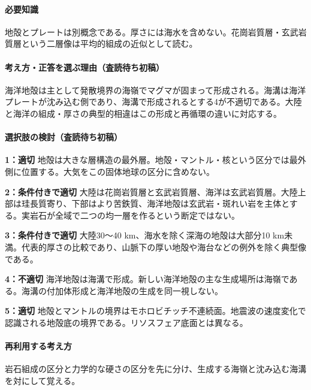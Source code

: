 \paragraph{必要知識} 地殻とプレートは別概念である。厚さには海水を含めない。花崗岩質層・玄武岩質層という二層像は平均的組成の近似として読む。

\paragraph{考え方・正答を選ぶ理由（査読待ち初稿）} 海洋地殻は主として発散境界の海嶺でマグマが固まって形成される。海溝は海洋プレートが沈み込む側であり、海溝で形成されるとする4が不適切である。大陸と海洋の組成・厚さの典型的相違はこの形成と再循環の違いに対応する。

\paragraph{選択肢の検討（査読待ち初稿）}\mbox{}\par

\noindent\textbf{1：適切} 地殻は大きな層構造の最外層。地殻・マントル・核という区分では最外側に位置する。大気をこの固体地球の区分に含めない。\par

\noindent\textbf{2：条件付きで適切} 大陸は花崗岩質層と玄武岩質層、海洋は玄武岩質層。大陸上部は珪長質寄り、下部はより苦鉄質、海洋地殻は玄武岩・斑れい岩を主体とする。実岩石が全域で二つの均一層を作るという断定ではない。\par

\noindent\textbf{3：条件付きで適切} 大陸30〜40 km、海水を除く深海の地殻は大部分10 km未満。代表的厚さの比較であり、山脈下の厚い地殻や海台などの例外を除く典型像である。\par

\noindent\textbf{4：不適切} 海洋地殻は海溝で形成。新しい海洋地殻の主な生成場所は海嶺である。海溝の付加体形成と海洋地殻の生成を同一視しない。\par

\noindent\textbf{5：適切} 地殻とマントルの境界はモホロビチッチ不連続面。地震波の速度変化で認識される地殻底の境界である。リソスフェア底面とは異なる。\par

\paragraph{再利用する考え方} 岩石組成の区分と力学的な硬さの区分を先に分け、生成する海嶺と沈み込む海溝を対にして覚える。

